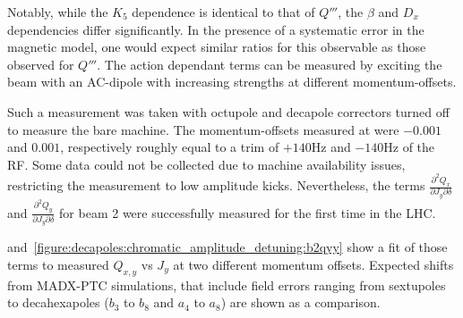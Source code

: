 Notably, while the $K_5$ dependence is identical to that of $Q'''$, the $\beta$ and $D_x$
dependencies differ significantly. In the presence of a systematic error in the magnetic model, one
would expect similar ratios for this observable as those observed for $Q'''$.
The action dependant terms can be measured by exciting the beam with an AC-dipole with increasing
strengths at different momentum-offsets.

Such a measurement was taken with octupole and decapole correctors turned off to measure the bare
machine. The momentum-offsets measured at were $-0.001$ and $0.001$, respectively roughly equal to
a trim of $+140$Hz and $-140$Hz of the RF. Some data could not be collected due to machine
availability issues, restricting the measurement to low amplitude kicks.
Nevertheless, the terms $\frac{\partial^2 Q_x}{\partial J_y \partial \delta}$ and $\frac{\partial^2
Q_y}{\partial J_y \partial \delta}$ for beam 2 were successfully measured for the first time in the
LHC. 

and~\cref{figure:decapoles:chromatic_amplitude_detuning:b2qyy} show a fit of those terms to measured
$Q_{x,y}$ vs $J_{y}$ at two different momentum offsets. Expected shifts from MADX-PTC simulations,
that include field errors ranging from sextupoles to decahexapoles ($b_3$ to $b_8$ and $a_4$ to
$a_8$) are shown as a comparison.


